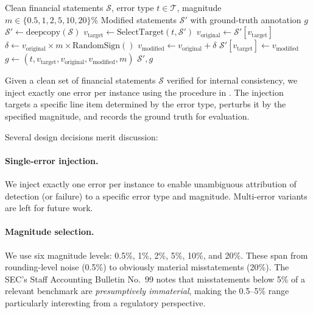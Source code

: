 \documentclass[11pt]{article}
\newcommand{\benchmark}{\textsc{FinVerBench}}
\begin{document}
\begin{algorithm}[t]
\caption{Error Injection for \benchmark{}}
\label{alg:injection}
\begin{algorithmic}[1]
\Require Clean financial statements $\mathcal{S}$, error type $t \in \mathcal{T}$, magnitude $m \in \{0.5, 1, 2, 5, 10, 20\}\%$
\Ensure Modified statements $\mathcal{S}'$ with ground-truth annotation $g$
\State $\mathcal{S}' \leftarrow \text{deepcopy}(\mathcal{S})$
\State $v_{\text{target}} \leftarrow \text{SelectTarget}(t, \mathcal{S}')$  
\State $v_{\text{original}} \leftarrow \mathcal{S}'[v_{\text{target}}]$
\State $\delta \leftarrow v_{\text{original}} \times m \times \text{RandomSign}()$
\State $v_{\text{modified}} \leftarrow v_{\text{original}} + \delta$
\State $\mathcal{S}'[v_{\text{target}}] \leftarrow v_{\text{modified}}$  
\State $g \leftarrow (t, v_{\text{target}}, v_{\text{original}}, v_{\text{modified}}, m)$
\State \Return $\mathcal{S}', g$
\end{algorithmic}
\end{algorithm}

Given a clean set of financial statements $\mathcal{S}$ verified for internal consistency, we inject exactly one error per instance using the procedure in .
The injection targets a specific line item determined by the error type, perturbs it by the specified magnitude, and records the ground truth for evaluation.

Several design decisions merit discussion:

\paragraph{Single-error injection.}
We inject exactly one error per instance to enable unambiguous attribution of detection (or failure) to a specific error type and magnitude.
Multi-error variants are left for future work.

\paragraph{Magnitude selection.}
We use six magnitude levels: 0.5\%, 1\%, 2\%, 5\%, 10\%, and 20\%.
These span from rounding-level noise (0.5\%) to obviously material misstatements (20\%).
The SEC's Staff Accounting Bulletin No.\ 99 notes that misstatements below 5\% of a relevant benchmark are \emph{presumptively immaterial}, making the 0.5--5\% range particularly interesting from a regulatory perspective.
\end{document}
